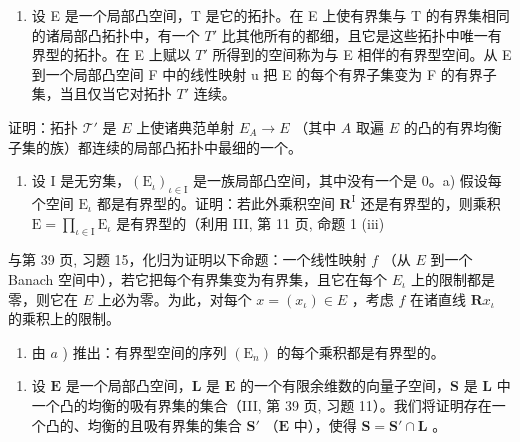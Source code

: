 \exercisegroup

\begin{enumerate}
\def\labelenumi{\arabic{enumi})}
\tightlist
\item
  设 E 是一个局部凸空间，T 是它的拓扑。在 E 上使有界集与 T 的有界集相同的诸局部凸拓扑中，有一个 \(T'\) 比其他所有的都细，且它是这些拓扑中唯一有界型的拓扑。在 E 上赋以 \(T'\) 所得到的空间称为与 E 相伴的有界型空间。从 E 到一个局部凸空间 F 中的线性映射 u 把 E 的每个有界子集变为 F 的有界子集，当且仅当它对拓扑 \(T'\) 连续。
\end{enumerate}

证明：拓扑 \(\mathcal{T}'\) 是 \(E\) 上使诸典范单射 \(E_A \to E\) （其中 \(A\) 取遍 \(E\) 的凸的有界均衡子集的族）都连续的局部凸拓扑中最细的一个。

\begin{enumerate}
\def\labelenumi{\arabic{enumi})}
\setcounter{enumi}{1}
\tightlist
\item
  设 I 是无穷集，\((\mathrm{E}_{\iota})_{\iota \in \mathrm{I}}\) 是一族局部凸空间，其中没有一个是 0。a) 假设每个空间 \(\mathrm{E}_{\iota}\) 都是有界型的。证明：若此外乘积空间 \(\mathbf{R}^{\mathrm{I}}\) 还是有界型的，则乘积 \(\mathrm{E} = \prod_{\iota \in \mathrm{I}}\mathrm{E}_{\iota}\) 是有界型的（利用 III, 第 11 页, 命题 1 (iii)
\end{enumerate}

与第 39 页, 习题 15，化归为证明以下命题：一个线性映射 \(f\) （从 \(E\) 到一个 Banach 空间中），若它把每个有界集变为有界集，且它在每个 \(E_{\iota}\) 上的限制都是零，则它在 \(E\) 上必为零。为此，对每个 \(x = (x_{\iota}) \in E\) ，考虑 \(f\) 在诸直线 \(\mathbf{R}x_{\iota}\) 的乘积上的限制。

\begin{enumerate}
\def\labelenumi{\alph{enumi})}
\setcounter{enumi}{1}
\tightlist
\item
  由 \(a\) ) 推出：有界型空间的序列 \((\mathrm{E}_n)\) 的每个乘积都是有界型的。
\end{enumerate}

\begin{enumerate}
\def\labelenumi{\arabic{enumi})}
\setcounter{enumi}{2}
\tightlist
\item
  设 \(\mathbf{E}\) 是一个局部凸空间，\(\mathbf{L}\) 是 \(\mathbf{E}\) 的一个有限余维数的向量子空间，\(\mathbf{S}\) 是 \(\mathbf{L}\) 中一个凸的均衡的吸有界集的集合（III, 第 39 页, 习题 11）。我们将证明存在一个凸的、均衡的且吸有界集的集合 \(\mathbf{S}'\) （\(\mathbf{E}\) 中），使得 \(\mathbf{S} = \mathbf{S}' \cap \mathbf{L}\) 。
\end{enumerate}

